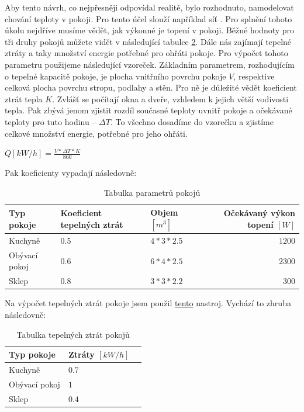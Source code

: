 Aby tento návrh, co nejpřesněji odpovídal realitě, bylo rozhodnuto, namodelovat chování teploty v pokoji. Pro tento účel slouží například síť .
Pro splnění tohoto úkolu nejdříve musíme vědět, jak výkonné je topení v pokoji. Běžné hodnoty pro tři druhy pokojů můžete vidět v následující tabulce \ref{tab:tepelne-ztraty}. Dále nás zajímají tepelné ztráty a taky množství energie potřebné pro ohřáti pokoje. Pro výpočet tohoto parametru použijeme následující vzoreček. Základním parametrem, rozhodujícím o tepelné kapacitě pokoje, je plocha vnitřního povrchu pokoje $V$, respektive celková plocha povrchu stropu, podlahy a stěn. Pro ně je důležité vědět koeficient ztrát tepla $K$. Zvlášť se počítají okna a dveře, vzhledem k jejich větší vodivosti tepla. Pak zbývá jenom zjistit rozdíl současné teploty uvnitř pokoje a očekávané teploty pro tuto hodinu -- $\Delta{T}$. To všechno dosadíme do vzorečku a zjistíme celkové množství energie, potřebné pro jeho ohřáti. \cite{tep_calc}
\begin{center}
 $Q[kW/h] = \frac{V*\Delta{T}*K}{860}$
\end{center}

Pak koeficienty vypadají následovně:

\begin{table}[H]
  \vskip6pt
  \caption{Tabulka parametrů pokojů}
   \vskip6pt
  \centering
  \begin{tabular}{lllr}
    \toprule
    Typ pokoje & Koeficient tepelných ztrát & Objem $[m^3]$ & Očekávaný výkon topení $[W]$ \\
   \midrule
   Kuchyně & 0.5 & $4*3*2.5$ & $1200$ \\
   Obývací pokoj & 0.6 & $6*4*2.5$ & $2300$ \\
   Sklep & 0.8 & $3*3*2.2$ & $300$ \\
    \bottomrule
  \end{tabular}
  \label{tab:Parametry}
\end{table}

Na výpočet tepelných ztrát pokoje jsem použil \href{https://wpcalc.com/kalkulyator-teplopoter/}{tento} nastroj.
Vychází to zhruba následovně:

\begin{table}[H]
  \vskip6pt
  \caption{Tabulka tepelných ztrát pokojů}
   \vskip6pt
  \centering
  \begin{tabular}{llr}
    \toprule
    Typ pokoje & Ztráty $[kW/h]$ \\
    \midrule
    Kuchyně & $0.7$ \\
   Obývací pokoj & $1$ \\
   Sklep & $0.4$ \\
    \bottomrule
  \end{tabular}
  \label{tab:tepelne-ztraty}
\end{table}

